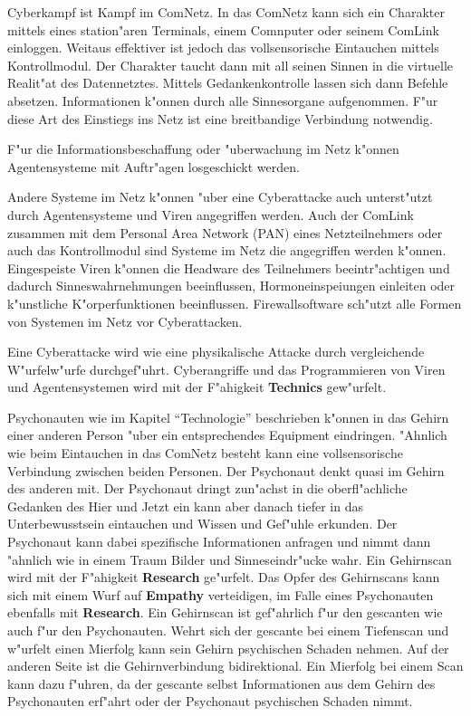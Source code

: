 Cyberkampf ist Kampf im ComNetz. In das ComNetz kann sich ein Charakter mittels eines station"aren Terminals, einem Comnputer oder seinem ComLink einloggen. Weitaus effektiver ist jedoch das vollsensorische Eintauchen mittels Kontrollmodul. Der Charakter taucht dann mit all seinen Sinnen in die virtuelle Realit"at des Datennetztes. Mittels Gedankenkontrolle lassen sich dann Befehle absetzen. Informationen k"onnen durch alle Sinnesorgane aufgenommen. F"ur diese Art des Einstiegs ins Netz ist eine breitbandige Verbindung notwendig. 

F"ur die Informationsbeschaffung oder "uberwachung im Netz k"onnen Agentensysteme mit Auftr"agen losgeschickt werden. 

Andere Systeme im Netz k"onnen "uber eine Cyberattacke auch unterst"utzt durch Agentensysteme und Viren angegriffen werden. Auch der ComLink zusammen mit dem Personal Area Network (PAN) eines Netzteilnehmers oder auch das Kontrollmodul sind Systeme im Netz die angegriffen werden k"onnen. Eingespeiste Viren k"onnen die Headware des Teilnehmers beeintr"achtigen und dadurch Sinneswahrnehmungen beeinflussen, Hormoneinspei\3ungen einleiten oder k"unstliche K"orperfunktionen beeinflussen. Firewallsoftware sch"utzt alle Formen von Systemen im Netz vor Cyberattacken.

Eine Cyberattacke wird wie eine physikalische Attacke durch vergleichende W"urfelw"urfe durchgef"uhrt. Cyberangriffe und das Programmieren von Viren und Agentensystemen wird mit der F"ahigkeit \textbf{Technics} gew"urfelt.

Psychonauten wie im Kapitel "`Technologie"' beschrieben k"onnen in das Gehirn einer anderen Person "uber ein entsprechendes Equipment eindringen. "Ahnlich wie beim Eintauchen in das ComNetz besteht kann eine vollsensorische Verbindung zwischen beiden Personen. Der Psychonaut denkt quasi im Gehirn des anderen mit. Der Psychonaut dringt zun"achst in die oberfl"achliche Gedanken des Hier und Jetzt ein kann aber danach tiefer in das Unterbewusstsein eintauchen und Wissen und Gef"uhle erkunden. Der Psychonaut kann dabei spezifische Informationen anfragen und nimmt dann "ahnlich wie in einem Traum Bilder und Sinneseindr"ucke wahr. Ein Gehirnscan wird mit der F"ahigkeit \textbf{Research} ge"urfelt. Das Opfer des Gehirnscans kann sich mit einem Wurf auf \textbf{Empathy} verteidigen, im Falle eines Psychonauten ebenfalls mit \textbf{Research}. Ein Gehirnscan ist gef"ahrlich f"ur den gescanten wie auch f"ur den Psychonauten. Wehrt sich der gescante bei einem Tiefenscan und w"urfelt einen Mi\3erfolg kann sein Gehirn psychischen Schaden nehmen. Auf der anderen Seite ist die Gehirnverbindung bidirektional. Ein Mi\3erfolg bei einem Scan kann dazu f"uhren, da\3 der gescante selbst Informationen aus dem Gehirn des Psychonauten erf"ahrt oder der Psychonaut psychischen Schaden nimmt.

